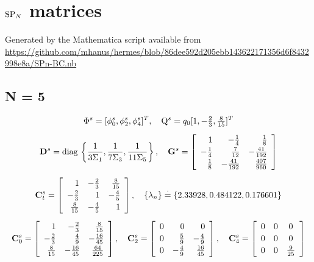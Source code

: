 \chapter{$\text{SP}_{N}$ matrices}\label{app:SPN}
Generated by the Mathematica script available from
\url{https://github.com/mhanus/hermes/blob/86dee592d205ebb143622171356d6f8432998e8a/SPn-BC.nb}
\section{N = 5}
$$
\begin{gathered}
\Phi^s = [\phi^s_0, \phi^s_2, \phi^s_4]^T,\quad \mathrm{Q}^s = q_0[1, -\tfrac{2}{3}, \tfrac{8}{15}]^T\\[.5em]
\mathbf{D}^s = \operatorname{diag\,} \left\{\frac{1}{3\Sigma_1}, \frac{1}{7\Sigma_3}, \frac{1}{11\Sigma_5}\right\},\quad
\mathbf{G}^s = \left[
\begin{array}{rrr}
 1 & -\frac{1}{4} & \frac{1}{8} \\[.2em]
 -\frac{1}{4} & \frac{7}{12} & -\frac{41}{192} \\[.2em]
 \frac{1}{8} & -\frac{41}{192} & \frac{407}{960} \\
\end{array}
\right]\\[.5em]
\mathbf{C}^s_t = \left[
\begin{array}{rrr}
 1 & -\frac{2}{3} & \frac{8}{15} \\[.2em]
 -\frac{2}{3} & 1 & -\frac{4}{5} \\[.2em]
 \frac{8}{15} & -\frac{4}{5} & 1 \\
\end{array}
\right],\quad \{\lambda_n\} \stackrel{\cdot}{=} \{2.33928,0.484122,0.176601\}\\[.5em]
\mathbf{C}^s_0 = \left[
\begin{array}{rrr}
 1 & -\frac{2}{3} & \frac{8}{15} \\[.2em]
 -\frac{2}{3} & \frac{4}{9} & -\frac{16}{45} \\[.2em]
 \frac{8}{15} & -\frac{16}{45} & \frac{64}{225}
\end{array}
\right],\quad
\mathbf{C}^s_2 = \left[
\begin{array}{rrr}
 0 & 0 & 0 \\[.2em]
 0 & \frac{5}{9} & -\frac{4}{9} \\[.2em]
 0 & -\frac{4}{9} & \frac{16}{45} \\
\end{array}
\right],\quad
\mathbf{C}^s_4 = \left[
\begin{array}{ccc}
 0 & 0 & 0 \\[.2em]
 0 & 0 & 0 \\[.2em]
 0 & 0 & \frac{9}{25} \\
\end{array}
\right]
\end{gathered}
$$
